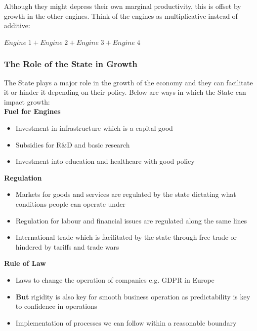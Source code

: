 \documentclass[12pt, letterpaper]{article}
\begin{document}
Although they might depress their own marginal productivity, this is offset by growth in the other engines. Think of the engines as multiplicative instead of additive:
\begin{center}
	$Engine\; 1 + Engine\; 2 + Engine\; 3 + Engine\; 4$
\end{center}

\subsubsection{The Role of the State in Growth}
The State plays a major role in the growth of the economy and they can facilitate it or hinder it depending on their policy. Below are ways in which the State can impact growth:\\

\textbf{Fuel for Engines}
\begin{itemize}
	\item Investment in infrastructure which is a capital good
	\item Subsidies for R\&D and basic research
	\item Investment into education and healthcare with good policy
\end{itemize}

\textbf{Regulation}
\begin{itemize}
	\item Markets for goods and services are regulated by the state dictating what conditions people can operate under
	\item Regulation for labour and financial issues are regulated along the same lines
	\item International trade which is facilitated by the state through free trade or hindered by tariffs and trade wars
\end{itemize}

\textbf{Rule of Law}
\begin{itemize}
	\item Laws to change the operation of companies e.g. GDPR in Europe
	\item \textbf{But} rigidity is also key for smooth business operation as predictability is key to confidence in operations
	\item Implementation of processes we can follow within a reasonable boundary
\end{itemize}
\end{document}
